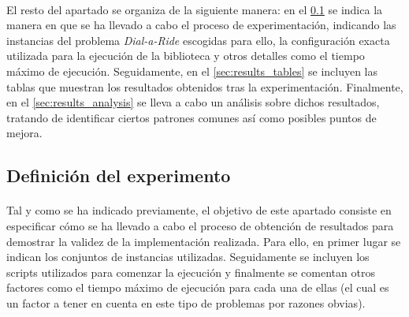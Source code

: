 \documentclass{subfiles}
\begin{document}
      \paragraph{}
      El resto del apartado se organiza de la siguiente manera: en el \cref{sec:results_definition} se indica la manera en que se ha llevado a cabo el proceso de experimentación, indicando las instancias del problema \emph{Dial-a-Ride} escogidas para ello, la configuración exacta utilizada para la ejecución de la biblioteca y otros detalles como el tiempo máximo de ejecución. Seguidamente, en el \cref{sec:results_tables} se incluyen las tablas que muestran los resultados obtenidos tras la experimentación. Finalmente, en el \cref{sec:results_analysis} se lleva a cabo un análisis sobre dichos resultados, tratando de identificar ciertos patrones comunes así como posibles puntos de mejora.

      \subsection{Definición del experimento}
      \label{sec:results_definition}

        \paragraph{}
        Tal y como se ha indicado previamente, el objetivo de este apartado consiste en especificar cómo se ha llevado a cabo el proceso de obtención de resultados para demostrar la validez de la implementación realizada. Para ello, en primer lugar se indican los conjuntos de instancias utilizadas. Seguidamente se incluyen los scripts utilizados para comenzar la ejecución y finalmente se comentan otros factores como el tiempo máximo de ejecución para cada una de ellas (el cual es un factor a tener en cuenta en este tipo de problemas por razones obvias).
\end{document}
